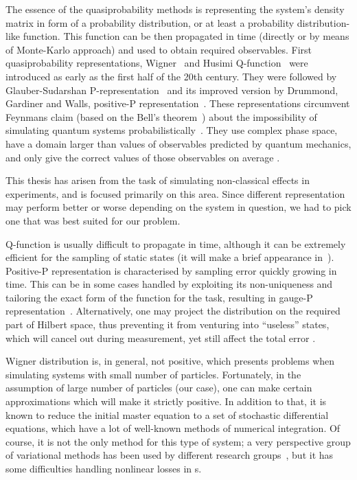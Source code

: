 The essence of the quasiprobability methods is representing the system's density matrix in form of a probability distribution, or at least a probability distribution-like function.
This function can be then propagated in time (directly or by means of Monte-Karlo approach) and used to obtain required observables.
First quasiprobability representations, Wigner~\cite{Wigner1932,Dirac1945,Moyal1947} and Husimi Q-function~\cite{Husimi1940} were introduced as early as the first half of the 20th century.
They were followed by Glauber-Sudarshan P-representation~\cite{Sudarshan1963,Glauber1963b,Glauber1963} and its improved version by Drummond, Gardiner and Walls, positive-P representation~\cite{Drummond1980,Drummond1981}.
These representations circumvent Feynmans claim (based on the Bell's theorem~\cite{Bell1964}) about the impossibility of simulating quantum systems probabilistically~\cite{Feynman1982}.
They use complex phase space, have a domain larger than values of observables predicted by quantum mechanics, and only give the correct values of those observables on average .

This thesis has arisen from the task of simulating non-classical effects in  experiments, and is focused primarily on this area.
Since different representation may perform better or worse depending on the system in question, we had to pick one that was best suited for our problem.

Q-function is usually difficult to propagate in time, although it can be extremely efficient for the sampling of static states (it will make a brief appearance in~).
Positive-P representation is characterised by sampling error quickly growing in time.
This can be in some cases handled by exploiting its non-uniqueness and tailoring the exact form of the function for the task, resulting in gauge-P representation~\cite{Deuar2002}.
Alternatively, one may project the distribution on the required part of Hilbert space, thus preventing it from venturing into ``useless'' states, which will cancel out during measurement, yet still affect the total error .

Wigner distribution is, in general, not positive, which presents problems when simulating systems with small number of particles.
Fortunately, in the assumption of large number of particles (our case), one can make certain approximations which will make it strictly positive.
In addition to that, it is known to reduce the initial master equation to a set of stochastic differential equations, which have a lot of well-known methods of numerical integration.
Of course, it is not the only method for this type of system; a very perspective group of variational methods has been used by different research groups~\cite{Li2008,Li2009,Sinatra2011},
but it has some difficulties handling nonlinear losses in s.

